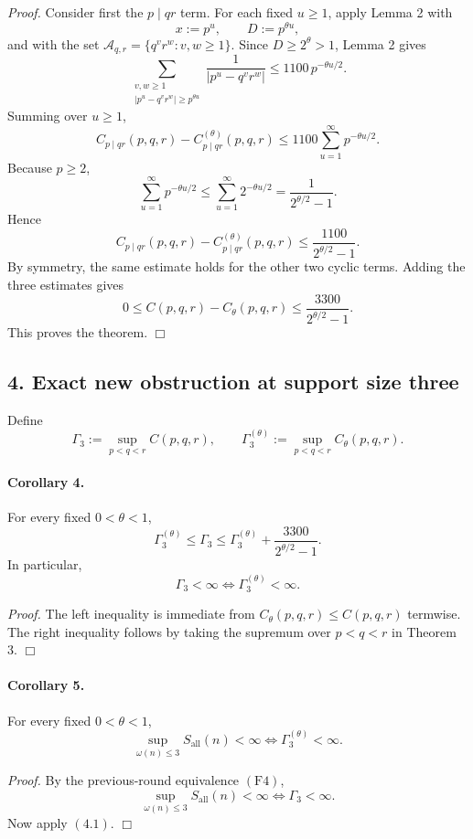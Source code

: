 \emph{Proof.}
Consider first the \(p\mid qr\) term. For each fixed \(u\ge 1\), apply Lemma 2 with
\[
x:=p^u,
\qquad
D:=p^{\theta u},
\]
and with the set \(\mathcal A_{q,r}=\{q^v r^w:v,w\ge 1\}\). Since \(D\ge 2^\theta>1\), Lemma 2 gives
\[
\sum_{\substack{v,w\ge 1\\ |p^u-q^v r^w|\ge p^{\theta u}}}
\frac{1}{|p^u-q^v r^w|}
\le 1100\,p^{-\theta u/2}.
\]
Summing over \(u\ge 1\),
\[
C_{p\mid qr}(p,q,r)-C_{p\mid qr}^{(\theta)}(p,q,r)
\le
1100\sum_{u=1}^{\infty}p^{-\theta u/2}.
\]
Because \(p\ge 2\),
\[
\sum_{u=1}^{\infty}p^{-\theta u/2}\le \sum_{u=1}^{\infty}2^{-\theta u/2}
=\frac{1}{2^{\theta/2}-1}.
\]
Hence
\[
C_{p\mid qr}(p,q,r)-C_{p\mid qr}^{(\theta)}(p,q,r)
\le
\frac{1100}{2^{\theta/2}-1}.
\]
By symmetry, the same estimate holds for the other two cyclic terms. Adding the three estimates gives
\[
0\le C(p,q,r)-C_\theta(p,q,r)\le \frac{3300}{2^{\theta/2}-1}.
\]
This proves the theorem.
\hfill\(\Box\)

\subsection*{4. Exact new obstruction at support size three}

Define
\[
\Gamma_3:=\sup_{p<q<r} C(p,q,r),
\qquad
\Gamma_3^{(\theta)}:=\sup_{p<q<r} C_\theta(p,q,r).
\]

\paragraph{Corollary 4.}
For every fixed \(0<\theta<1\),
\[
\Gamma_3^{(\theta)}\le \Gamma_3\le \Gamma_3^{(\theta)}+\frac{3300}{2^{\theta/2}-1}.
\]
In particular,
\[
\Gamma_3<\infty \iff \Gamma_3^{(\theta)}<\infty.
\tag{4.1}
\]

\emph{Proof.}
The left inequality is immediate from \(C_\theta(p,q,r)\le C(p,q,r)\) termwise. The right inequality follows by taking the supremum over \(p<q<r\) in Theorem 3.
\hfill\(\Box\)

\paragraph{Corollary 5.}
For every fixed \(0<\theta<1\),
\[
\sup_{\omega(n)\le 3} S_{\mathrm{all}}(n)<\infty
\iff
\Gamma_3^{(\theta)}<\infty.
\tag{4.2}
\]

\emph{Proof.}
By the previous-round equivalence \((\mathrm{F4})\),
\[
\sup_{\omega(n)\le 3} S_{\mathrm{all}}(n)<\infty
\iff
\Gamma_3<\infty.
\]
Now apply \((4.1)\).
\hfill\(\Box\)

